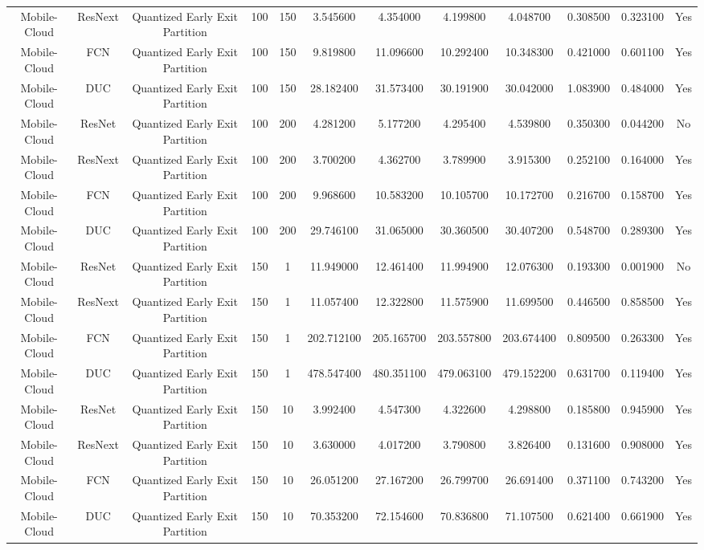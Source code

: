 \begin{tabular}{|c||c||c||c||c||c||c||c||c||c||c||c|}
Mobile-Cloud & ResNext & Quantized Early Exit Partition & 100 & 150 & 3.545600 & 4.354000 & 4.199800 & 4.048700 & 0.308500 & 0.323100 & Yes \\
Mobile-Cloud & FCN & Quantized Early Exit Partition & 100 & 150 & 9.819800 & 11.096600 & 10.292400 & 10.348300 & 0.421000 & 0.601100 & Yes \\
Mobile-Cloud & DUC & Quantized Early Exit Partition & 100 & 150 & 28.182400 & 31.573400 & 30.191900 & 30.042000 & 1.083900 & 0.484000 & Yes \\
Mobile-Cloud & ResNet & Quantized Early Exit Partition & 100 & 200 & 4.281200 & 5.177200 & 4.295400 & 4.539800 & 0.350300 & 0.044200 & No \\
Mobile-Cloud & ResNext & Quantized Early Exit Partition & 100 & 200 & 3.700200 & 4.362700 & 3.789900 & 3.915300 & 0.252100 & 0.164000 & Yes \\
Mobile-Cloud & FCN & Quantized Early Exit Partition & 100 & 200 & 9.968600 & 10.583200 & 10.105700 & 10.172700 & 0.216700 & 0.158700 & Yes \\
Mobile-Cloud & DUC & Quantized Early Exit Partition & 100 & 200 & 29.746100 & 31.065000 & 30.360500 & 30.407200 & 0.548700 & 0.289300 & Yes \\
Mobile-Cloud & ResNet & Quantized Early Exit Partition & 150 & 1 & 11.949000 & 12.461400 & 11.994900 & 12.076300 & 0.193300 & 0.001900 & No \\
Mobile-Cloud & ResNext & Quantized Early Exit Partition & 150 & 1 & 11.057400 & 12.322800 & 11.575900 & 11.699500 & 0.446500 & 0.858500 & Yes \\
Mobile-Cloud & FCN & Quantized Early Exit Partition & 150 & 1 & 202.712100 & 205.165700 & 203.557800 & 203.674400 & 0.809500 & 0.263300 & Yes \\
Mobile-Cloud & DUC & Quantized Early Exit Partition & 150 & 1 & 478.547400 & 480.351100 & 479.063100 & 479.152200 & 0.631700 & 0.119400 & Yes \\
Mobile-Cloud & ResNet & Quantized Early Exit Partition & 150 & 10 & 3.992400 & 4.547300 & 4.322600 & 4.298800 & 0.185800 & 0.945900 & Yes \\
Mobile-Cloud & ResNext & Quantized Early Exit Partition & 150 & 10 & 3.630000 & 4.017200 & 3.790800 & 3.826400 & 0.131600 & 0.908000 & Yes \\
Mobile-Cloud & FCN & Quantized Early Exit Partition & 150 & 10 & 26.051200 & 27.167200 & 26.799700 & 26.691400 & 0.371100 & 0.743200 & Yes \\
Mobile-Cloud & DUC & Quantized Early Exit Partition & 150 & 10 & 70.353200 & 72.154600 & 70.836800 & 71.107500 & 0.621400 & 0.661900 & Yes \\

\end{tabular}
